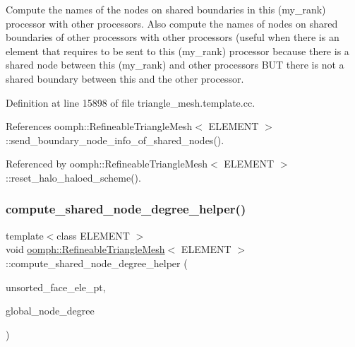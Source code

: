 Compute the names of the nodes on shared boundaries in this (my\+\_\+rank) processor with other processors. Also compute the names of nodes on shared boundaries of other processors with other processors (useful when there is an element that requires to be sent to this (my\+\_\+rank) processor because there is a shared node between this (my\+\_\+rank) and other processors B\+UT there is not a shared boundary between this and the other processor. 



Definition at line 15898 of file triangle\+\_\+mesh.\+template.\+cc.



References oomph\+::\+Refineable\+Triangle\+Mesh$<$ E\+L\+E\+M\+E\+N\+T $>$\+::send\+\_\+boundary\+\_\+node\+\_\+info\+\_\+of\+\_\+shared\+\_\+nodes().



Referenced by oomph\+::\+Refineable\+Triangle\+Mesh$<$ E\+L\+E\+M\+E\+N\+T $>$\+::reset\+\_\+halo\+\_\+haloed\+\_\+scheme().

\mbox{\label{classoomph_1_1RefineableTriangleMesh_a4c2c3ff989c57ac84bbc9a8b5fb1db26}} 
\subsubsection{\texorpdfstring{compute\+\_\+shared\+\_\+node\+\_\+degree\+\_\+helper()}{compute\_shared\_node\_degree\_helper()}}
{\footnotesize\ttfamily template$<$class E\+L\+E\+M\+E\+NT $>$ \\
void \hyperlink{classoomph_1_1RefineableTriangleMesh}{oomph\+::\+Refineable\+Triangle\+Mesh}$<$ E\+L\+E\+M\+E\+NT $>$\+::compute\+\_\+shared\+\_\+node\+\_\+degree\+\_\+helper (\begin{DoxyParamCaption}\item[{Vector$<$ Vector$<$ Finite\+Element $\ast$$>$ $>$ \&}]{unsorted\+\_\+face\+\_\+ele\+\_\+pt,  }\item[{std\+::map$<$ Node $\ast$, unsigned $>$ \&}]{global\+\_\+node\+\_\+degree }\end{DoxyParamCaption})}



